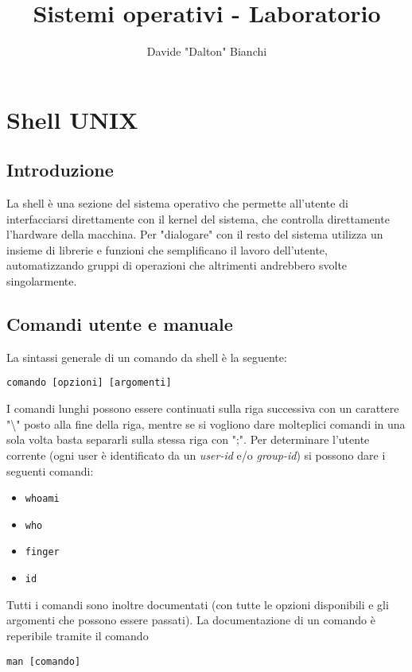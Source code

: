 \documentclass[a4paper]{article}
\begin{document}
\hypersetup{hidelinks, colorlinks = true, linkcolor = black}
\large
\title{Sistemi operativi - Laboratorio}
\author{Davide "Dalton" Bianchi}
\pagestyle{fancy}
\maketitle
\newpage
{}
\tableofcontents
\newpage
{}

\section{Shell UNIX}
\subsection{Introduzione}
La shell è una sezione del sistema operativo che permette all'utente di interfacciarsi direttamente con il kernel del sistema, che controlla direttamente l'hardware della macchina.
Per "dialogare" con il resto del sistema utilizza un insieme di librerie e funzioni che semplificano il lavoro dell'utente, automatizzando gruppi di operazioni che altrimenti andrebbero svolte singolarmente.

\subsection{Comandi utente e manuale}
La sintassi generale di un comando da shell è la seguente:
\begin{verbatim}
comando [opzioni] [argomenti]
\end{verbatim}
I comandi lunghi possono essere continuati sulla riga successiva con un carattere "\textbackslash" posto alla fine della riga, mentre se si vogliono dare molteplici comandi in una sola volta basta separarli sulla stessa riga con ";".
Per determinare l'utente corrente (ogni user è identificato da un \textit{user-id} e/o \textit{group-id}) si possono dare i seguenti comandi:
\begin{itemize}
\item \verb|whoami|
\item \verb|who|
\item \verb|finger|
\item \verb|id|
\end{itemize}
Tutti i comandi sono inoltre documentati (con tutte le opzioni disponibili e gli argomenti che possono essere passati). La documentazione di un comando è reperibile tramite il comando
\begin{verbatim}
man [comando]
\end{verbatim}
\end{document}
